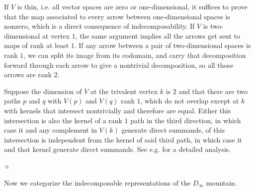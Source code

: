 \documentclass{article}
\newenvironment{proof}{\vspace*{2ex}\noindent {\em Proof:}
}{\hfill $\diamond$ \\[2ex]}
\begin{document}
\begin{proof}
If $V$ is thin, i.e. all vector spaces are zero or one-dimensional, it suffices to prove that the map associated to every arrow between one-dimensional spaces is nonzero, which is a direct consequence of indecomposability. If $V$ is two-dimensional at vertex $1$, the same argument implies all the arrows get sent to maps of rank at least $1$.  If any arrow between a pair of two-dimensional spaces is rank $1$, we can split its image from its codomain, and carry that decomposition forward through each arrow to give a nontrivial decomposition, so all those arrows are rank $2$. 

Suppose the dimension of $V$ at the trivalent vertex $k$ is $2$ and that there are two paths $p$ and $q$ with $V(p)$ and $V(q)$ rank $1$, which do not overlap except at $k$ with kernels that intersect nontrivially and therefore are equal. Either this intersection is also the kernel of a rank $1$ path in the third direction, in which case it and any complement in $V(k)$ generate direct summands, of this intersection is independent from the kernel of said third path, in which case it and that kernel generate direct summands. See e.g. \cite{ringel2016} for a detailed analysis.  


\end{proof}

Now we categorize the indecomposable representations of the $D_\infty$ mountain.
\end{document}
